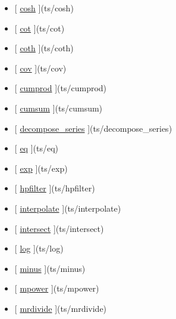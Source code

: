 \documentclass[letterpaper,10pt,english]{sphinxmanual}
\begin{document}
\begin{itemize}
\item {} 
{[} {\hyperref[classes/time_series/@ts/ts:cosh]{cosh}} {]}(ts/cosh)

\item {} 
{[} {\hyperref[classes/time_series/@ts/ts:cot]{cot}} {]}(ts/cot)

\item {} 
{[} {\hyperref[classes/time_series/@ts/ts:coth]{coth}} {]}(ts/coth)

\item {} 
{[} {\hyperref[classes/time_series/@ts/ts:cov]{cov}} {]}(ts/cov)

\item {} 
{[} {\hyperref[classes/time_series/@ts/ts:cumprod]{cumprod}} {]}(ts/cumprod)

\item {} 
{[} {\hyperref[classes/time_series/@ts/ts:cumsum]{cumsum}} {]}(ts/cumsum)

\item {} 
{[} {\hyperref[classes/time_series/@ts/ts:decompose-series]{decompose\_series}} {]}(ts/decompose\_series)

\item {} 
{[} {\hyperref[classes/time_series/@ts/ts:eq]{eq}} {]}(ts/eq)

\item {} 
{[} {\hyperref[classes/time_series/@ts/ts:exp]{exp}} {]}(ts/exp)

\item {} 
{[} {\hyperref[classes/time_series/@ts/ts:hpfilter]{hpfilter}} {]}(ts/hpfilter)

\item {} 
{[} {\hyperref[classes/time_series/@ts/ts:interpolate]{interpolate}} {]}(ts/interpolate)

\item {} 
{[} {\hyperref[classes/time_series/@ts/ts:intersect]{intersect}} {]}(ts/intersect)

\item {} 
{[} {\hyperref[classes/time_series/@ts/ts:log]{log}} {]}(ts/log)

\item {} 
{[} {\hyperref[classes/time_series/@ts/ts:minus]{minus}} {]}(ts/minus)

\item {} 
{[} {\hyperref[classes/time_series/@ts/ts:mpower]{mpower}} {]}(ts/mpower)

\item {} 
{[} {\hyperref[classes/time_series/@ts/ts:mrdivide]{mrdivide}} {]}(ts/mrdivide)


\end{itemize}
\end{document}
